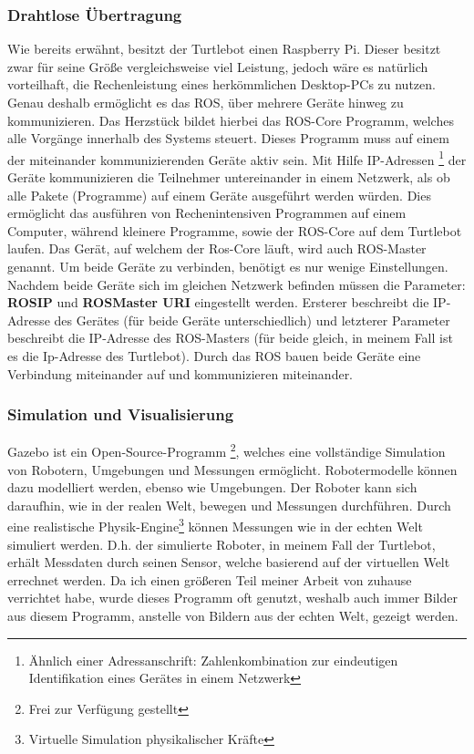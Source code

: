 {{		\subsubsection{Drahtlose Übertragung}
		{ Wie bereits erwähnt, besitzt der Turtlebot einen Raspberry Pi. Dieser besitzt zwar für seine Größe vergleichsweise viel Leistung, jedoch wäre es natürlich vorteilhaft, die Rechenleistung eines herkömmlichen Desktop-PCs zu nutzen. Genau deshalb ermöglicht es das ROS, über mehrere Geräte hinweg zu kommunizieren. Das Herzstück bildet hierbei das ROS-Core Programm, welches alle Vorgänge innerhalb des Systems steuert. Dieses Programm muss auf einem der miteinander kommunizierenden Geräte aktiv sein. Mit Hilfe IP-Adressen \footnote{Ähnlich einer Adressanschrift: Zahlenkombination zur eindeutigen Identifikation eines Gerätes in einem Netzwerk} der Geräte kommunizieren die Teilnehmer untereinander in einem Netzwerk, als ob alle Pakete (Programme) auf einem Geräte ausgeführt werden würden. Dies ermöglicht das ausführen von Rechenintensiven Programmen auf einem Computer, während kleinere Programme, sowie der ROS-Core auf dem Turtlebot laufen. Das Gerät, auf welchem der Ros-Core läuft, wird auch ROS-Master genannt. Um beide Geräte zu verbinden, benötigt es nur wenige Einstellungen. Nachdem beide Geräte sich im gleichen Netzwerk befinden müssen die Parameter: \textbf{ROS\textunderscore IP} und \textbf{ROS\textunderscore Master \textunderscore URI} eingestellt werden. Ersterer beschreibt die IP-Adresse des Gerätes (für beide Geräte unterschiedlich) und letzterer Parameter beschreibt die IP-Adresse des ROS-Masters (für beide gleich, in meinem Fall ist es die Ip-Adresse des Turtlebot). Durch das ROS bauen beide Geräte eine Verbindung miteinander auf und kommunizieren miteinander.
		}
		
		\subsubsection{Simulation und Visualisierung}
		{
			Gazebo ist ein Open-Source-Programm \footnote{Frei zur Verfügung gestellt}, welches eine vollständige Simulation von Robotern, Umgebungen und Messungen ermöglicht. Robotermodelle können dazu modelliert werden, ebenso wie Umgebungen. Der Roboter kann sich daraufhin, wie in der realen Welt, bewegen und Messungen durchführen. Durch eine realistische Physik-Engine\footnote{Virtuelle Simulation physikalischer Kräfte} können Messungen wie in der echten Welt simuliert werden. D.h. der simulierte Roboter, in meinem Fall der Turtlebot, erhält Messdaten durch seinen Sensor, welche basierend auf der virtuellen Welt errechnet werden. Da ich einen größeren Teil meiner Arbeit von zuhause verrichtet habe, wurde dieses Programm oft genutzt, weshalb auch immer Bilder aus diesem Programm, anstelle von Bildern aus der echten Welt, gezeigt werden.
			
}}}
